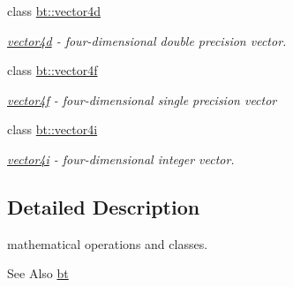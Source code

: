 \begin{DoxyCompactItemize}
class \hyperlink{classbt_1_1vector4d}{bt\-::vector4d}
\begin{DoxyCompactList}\small\item\em \hyperlink{classbt_1_1vector4d}{vector4d} -\/ four-\/dimensional double precision vector. \end{DoxyCompactList}\item 
class \hyperlink{classbt_1_1vector4f}{bt\-::vector4f}
\begin{DoxyCompactList}\small\item\em \hyperlink{classbt_1_1vector4f}{vector4f} -\/ four-\/dimensional single precision vector \end{DoxyCompactList}\item 
class \hyperlink{classbt_1_1vector4i}{bt\-::vector4i}
\begin{DoxyCompactList}\small\item\em \hyperlink{classbt_1_1vector4i}{vector4i} -\/ four-\/dimensional integer vector. \end{DoxyCompactList}\end{DoxyCompactItemize}


\subsection{Detailed Description}
mathematical operations and classes. \begin{DoxySeeAlso}{See Also}
\hyperlink{namespacebt}{bt} 
\end{DoxySeeAlso}
